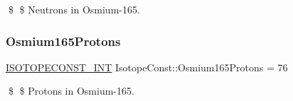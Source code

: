 \$ \$ Neutrons in Osmium-\/165. \mbox{\label{group___isotope_const-_osmium-_os165_ga3e531e0fee0bd0d4e580af93b2f776e2}} 
\subsubsection{\texorpdfstring{Osmium165\+Protons}{Osmium165Protons}}
{\footnotesize\ttfamily \mbox{\hyperlink{group___isotope_const-_macros_ga5f18360b3e99483a35c32d789e62621c}{I\+S\+O\+T\+O\+P\+E\+C\+O\+N\+S\+T\+\_\+\+I\+NT}} Isotope\+Const\+::\+Osmium165\+Protons = 76}

\$ \$ Protons in Osmium-\/165. 